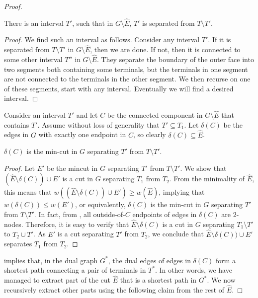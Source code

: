 \begin{proof}
	\begin{observation}
		\label{obs: interval}
		There is an interval $T'$, such that in $G\setminus \hat E$, $T'$ is separated from $T\setminus T'$.
	\end{observation}
	\begin{proof}
		We find such an interval as follows. Consider any interval $T'$. If it is separated from $T\setminus T'$ in $G\setminus \hat E$, then we are done. If not, then it is connected to some other interval $T''$ in $G\setminus \hat E$. They separate the boundary of the outer face into two segments both containing some terminals, but the terminals in one segment are not connected to the terminals in the other segment. We then recurse on one of these segments, start with any interval. Eventually we will find a desired interval.
	\end{proof}
	
	Consider an interval $T'$ and let $C$ be the connected component in $G\setminus \hat E$ that contains $T'$. Assume without loss of generality that $T'\subseteq T_1$. Let $\delta(C)$ be the edges in $G$ with exactly one endpoint in $C$, so clearly $\delta(C)\subseteq \hat E$. 
	
	\begin{claim}
		\label{clm: interval cut}
		$\delta(C)$ is the min-cut in $G$ separating $T'$ from $T\setminus T'$.
	\end{claim}
	\begin{proof}
		Let $E'$ be the mincut in $G$ separating $T'$ from $T\setminus T'$. We show that $(\hat E\setminus \delta(C))\cup E'$ is a cut in $G$ separating $T_1$ from $T_2$. From the minimality of $\hat E$, this means that $w((\hat E\setminus \delta(C))\cup E')\ge w(\hat E)$, implying that $w(\delta(C))\le w(E')$, or equivalently, $\delta(C)$ is the min-cut in $G$ separating $T'$ from $T\setminus T'$.
		In fact, from , all outside-of-$C$ endpoints of edges in $\delta(C)$ are $2$-nodes.
		Therefore, it is easy to verify that $\hat E\setminus \delta(C)$ is a cut in $G$ separating $T_1\setminus T'$ to $T_2\cup T'$. As $E'$ is a cut separating $T'$ from $T_2$, we conclude that $\hat E\setminus \delta(C))\cup E'$ separates $T_1$ from $T_2$.
	\end{proof}
	
	
	 implies that, in the dual graph $G^*$, the dual edges of edges in $\delta(C)$ form a shortest path connecting a pair of terminals in $T^*$.
	In other words, we have managed to extract part of the cut $\hat E$ that is a shortest path in $G^*$. We now recursively extract other parts using the following claim from the rest of $\hat E$.
	

\end{proof}
